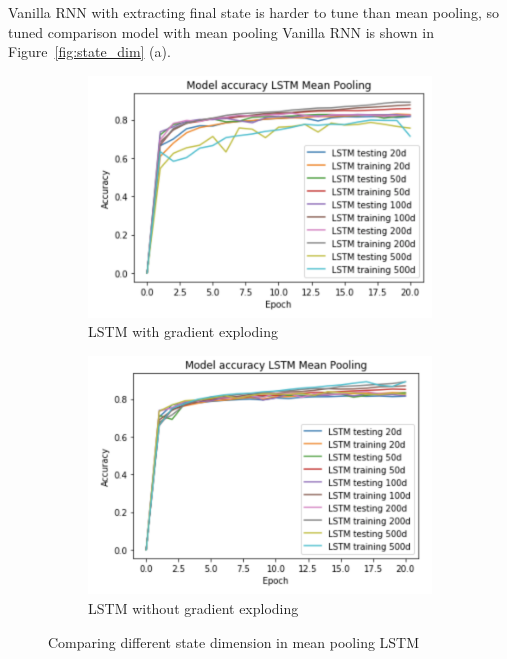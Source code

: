 \documentclass[12pt,letterpaper]{article}
\begin{document}
Vanilla RNN with extracting final state is harder to tune than mean pooling, so tuned comparison model with mean pooling Vanilla RNN is shown in Figure~\ref{fig:state_dim} (a).

\begin{figure}[h]
    \begin{subfigure}{0.49\textwidth}
    \includegraphics[width=\linewidth]{different_dim_lstm_mean_pool_1.png}
    \caption{\small LSTM with gradient exploding} \label{fig:e}
    \end{subfigure}\hspace*{\fill}
    \begin{subfigure}{0.49\textwidth}
    \includegraphics[width=\linewidth]{different_dim_lstm_mean_pool_2.png}
    \caption{\small LSTM without gradient exploding} \label{fig:f}
    \end{subfigure}
    \caption{Comparing different state dimension in mean pooling LSTM}
    \label{fig:LSTM_gradient_exploding}
\end{figure}
\end{document}
